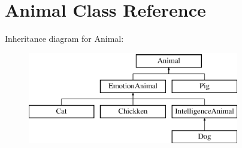 \hypertarget{class_animal}{}\section{Animal Class Reference}
\label{class_animal}
Inheritance diagram for Animal\+:\begin{figure}[H]
\begin{center}
\leavevmode
\includegraphics[height=4.000000cm]{class_animal}
\end{center}
\end{figure}
